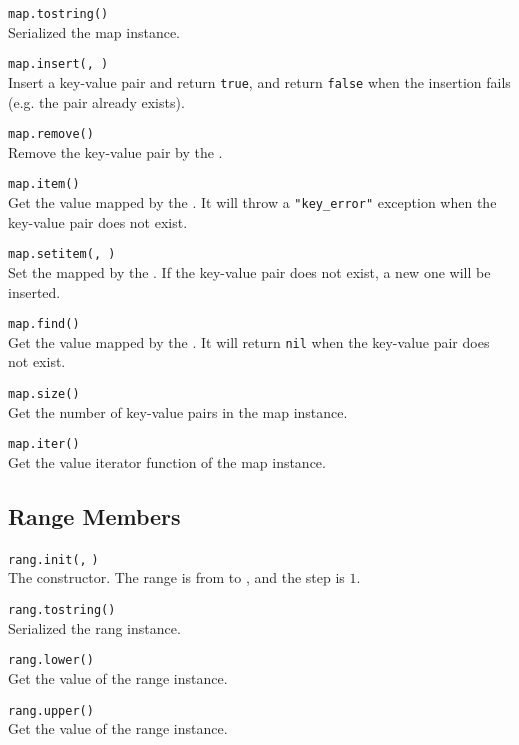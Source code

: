 \hangpar \texttt{map.tostring()}\\
Serialized the map instance.

\hangpar \texttt{map.insert(}\texttt{, }\texttt{)}\\
Insert a key-value pair and return \texttt{true}, and return \texttt{false} when the insertion fails (e.g. the pair already exists).

\hangpar \texttt{map.remove(}\texttt{)}\\
Remove the key-value pair by the .

\hangpar \texttt{map.item(}\texttt{)}\\
Get the value mapped by the . It will throw a \texttt{"key\_error"} exception when the key-value pair does not exist.

\hangpar \texttt{map.setitem(}\texttt{, }\texttt{)}\\
Set the  mapped by the . If the key-value pair does not exist, a new one will be inserted.

\hangpar \texttt{map.find(}\texttt{)}\\
Get the value mapped by the . It will return \texttt{nil} when the key-value pair does not exist.

\hangpar \texttt{map.size()}\\
Get the number of key-value pairs in the map instance.

\hangpar \texttt{map.iter()}\\
Get the value iterator function of the map instance. 

\subsection*{Range Members}

\hangpar \texttt{rang.init(}\texttt{,} \texttt{)}\\
The constructor. The range is from  to , and the step is $1$.

\hangpar \texttt{rang.tostring()}\\
Serialized the rang instance.

\hangpar \texttt{rang.lower()}\\
Get the  value of the range instance.

\hangpar \texttt{rang.upper()}\\
Get the  value of the range instance.


